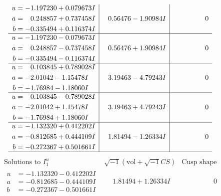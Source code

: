\documentclass[1p]{elsarticle_modified}
\theoremstyle{definition}
\newcommand{\I}{\sqrt{-1}}
\begin{document}
$$\begin{array}{c|c|c}
\begin{aligned}
u &= -1.197230 + 0.079673 I \\
a &= \phantom{-}0.248857 + 0.737458 I \\
b &= -0.335494 + 0.116374 I\end{aligned}
 & \phantom{-}0.56476 - 1.90984 I & \phantom{-0.000000 } 0 \\ \hline\begin{aligned}
u &= -1.197230 - 0.079673 I \\
a &= \phantom{-}0.248857 - 0.737458 I \\
b &= -0.335494 - 0.116374 I\end{aligned}
 & \phantom{-}0.56476 + 1.90984 I & \phantom{-0.000000 } 0 \\ \hline\begin{aligned}
u &= \phantom{-}0.103845 + 0.789028 I \\
a &= -2.01042 - 1.15478 I \\
b &= -1.76984 - 1.18060 I\end{aligned}
 & \phantom{-}3.19463 - 4.79243 I & \phantom{-0.000000 } 0 \\ \hline\begin{aligned}
u &= \phantom{-}0.103845 - 0.789028 I \\
a &= -2.01042 + 1.15478 I \\
b &= -1.76984 + 1.18060 I\end{aligned}
 & \phantom{-}3.19463 + 4.79243 I & \phantom{-0.000000 } 0 \\ \hline\begin{aligned}
u &= -1.132320 + 0.412202 I \\
a &= -0.812685 + 0.444109 I \\
b &= -0.272367 + 0.501661 I\end{aligned}
 & \phantom{-}1.81494 - 1.26334 I & \phantom{-0.000000 } 0\\
 \hline 
 \end{array}$$\newpage$$\begin{array}{c|c|c}  
\text{Solutions to }I^u_{1}& \I (\text{vol} + \sqrt{-1}CS) & \text{Cusp shape}\\
 \hline 
\begin{aligned}
u &= -1.132320 - 0.412202 I \\
a &= -0.812685 - 0.444109 I \\
b &= -0.272367 - 0.501661 I\end{aligned}
 & \phantom{-}1.81494 + 1.26334 I & \phantom{-0.000000 } 0 \\ \hline\begin{aligned}

\end{aligned}
\end{array}$$
\end{document}
